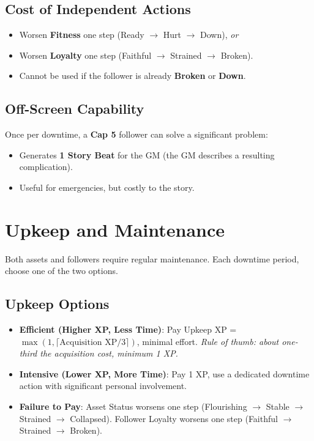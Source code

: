 \subsection*{Cost of Independent Actions}
\label{sec:follower-independent-cost}
\begin{itemize}
\item Worsen \textbf{Fitness} one step (Ready $\rightarrow$ Hurt $\rightarrow$ Down), \emph{or}
\item Worsen \textbf{Loyalty} one step (Faithful $\rightarrow$ Strained $\rightarrow$ Broken).
\item Cannot be used if the follower is already \textbf{Broken} or \textbf{Down}.
\end{itemize}

\subsection*{Off-Screen Capability}
\label{sec:follower-offscreen}
Once per downtime, a \textbf{Cap 5} follower can solve a significant problem:
\begin{itemize}
\item Generates \textbf{1 Story Beat} for the GM (the GM describes a resulting complication).
\item Useful for emergencies, but costly to the story.
\end{itemize}

\section{Upkeep and Maintenance}
\label{subsec:upkeep-options}

Both assets and followers require regular maintenance. Each downtime period, choose one of the two options.

\subsection*{Upkeep Options}
\label{sec:upkeep-options}
\begin{itemize}
\item \textbf{Efficient (Higher XP, Less Time)}:  
  Pay Upkeep XP = $\max(1, \lceil \text{Acquisition XP} / 3 \rceil)$, minimal effort.  
  \emph{Rule of thumb: about one-third the acquisition cost, minimum 1 XP.}
\item \textbf{Intensive (Lower XP, More Time)}:  
  Pay 1 XP, use a dedicated downtime action with significant personal involvement.
\item \textbf{Failure to Pay}:  
  Asset Status worsens one step (Flourishing $\rightarrow$ Stable $\rightarrow$ Strained $\rightarrow$ Collapsed).  
  Follower Loyalty worsens one step (Faithful $\rightarrow$ Strained $\rightarrow$ Broken).
\end{itemize}

